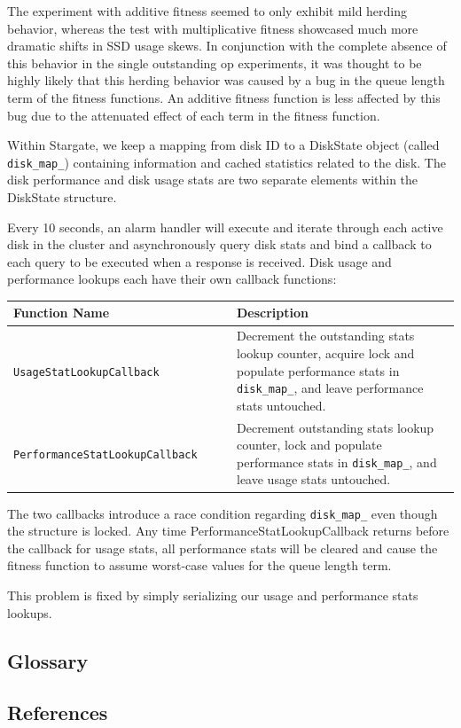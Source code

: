 \documentclass[12pt]{article}
\begin{document}
  The experiment with additive fitness seemed to only exhibit mild herding
  behavior, whereas the test with multiplicative fitness showcased much more
  dramatic shifts in SSD usage skews. In conjunction with the complete absence
  of this behavior in the single outstanding op experiments, it was thought to
  be highly likely that this herding behavior was caused by a bug in the queue
  length term of the fitness functions. An additive fitness function is less
  affected by this bug due to the attenuated effect of each term in the fitness
  function.

  Within Stargate, we keep a mapping from disk ID to a DiskState object (called
  \verb|disk_map_|) containing information and cached statistics related to the
  disk. The disk performance and disk usage stats are two separate elements
  within the DiskState structure.

  Every 10 seconds, an alarm handler will execute and iterate through each
  active disk in the cluster and asynchronously query disk stats and bind a
  callback to each query to be executed when a response is received. Disk usage
  and performance lookups each have their own callback functions:

  \begin{center}
    \begin{tabular}{ | p{0.5\linewidth} | p{0.5\linewidth} | }
      \hline
      \textbf{Function Name} & \textbf{Description} \\ \hline
      \verb|UsageStatLookupCallback| & Decrement the outstanding stats lookup
                                       counter, acquire lock and populate
                                       performance stats in \verb|disk_map_|,
                                       and leave performance stats untouched.
                                       \\ \hline

      \verb|PerformanceStatLookupCallback| & Decrement outstanding stats
                                             lookup counter, lock and
                                             populate performance stats in
                                             \verb|disk_map_|, and leave
                                             usage stats untouched. \\ \hline

      \hline
    \end{tabular}
  \end{center}

  The two callbacks introduce a race condition regarding \verb|disk_map_| even
  though the structure is locked. Any time PerformanceStatLookupCallback
  returns before the callback for usage stats, all performance stats will be
  cleared and cause the fitness function to assume worst-case values for the
  queue length term.

  This problem is fixed by simply serializing our usage and performance stats
  lookups.


  \subsection{Glossary}


  \subsection{References}

\end{document}
